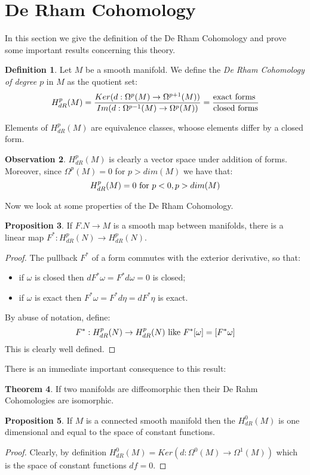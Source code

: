 \documentclass[12pt,a4paper]{report}
\theoremstyle{definition}
\newtheorem{Def}{Definition}[chapter]
\theoremstyle{Theorem}
\newtheorem{Theo}[Def]{Theorem}
\newtheorem{Prop}[Def]{Proposition}
\theoremstyle{definition}
\theoremstyle{definition}
\newtheorem{Obs}[Def]{Observation}
\begin{document}
	\section{De Rham Cohomology}
	In this section we give the definition of the De Rham Cohomology and prove some important results concerning this theory.
	\begin{Def}
		Let $M$ be a smooth manifold. We define the \textit{De Rham Cohomology of degree $p$} in $M$ as the quotient set:
		$$H_{dR}^p(M)={Ker(d:\Omega^p(M)\rightarrow \Omega^{p+1}(M))\over Im(d:\Omega^{p-1}(M)\rightarrow \Omega^{p}(M))}={\hbox{exact forms }\over \hbox{closed forms}}$$ 
	\end{Def}
	Elements of $H_{dR}^p(M)$ are equivalence classes, whoose elements differ by a closed form.
	\begin{Obs}
		$H_{dR}^p(M)$ is clearly a vector space under addition of forms. Moreover, since $\Omega^p(M)=0$ for $p>dim(M)$ we have that:
		$$H^p_{dR}(M)=0\hbox{ for }p<0,p>dim(M)$$
	\end{Obs}
	Now we look at some properties of the De Rham Cohomology.
	\begin{Prop}
		If $F.N\rightarrow M$ is a smooth map between manifolds, there is a linear map $F^*:H^p_{dR}(N)\rightarrow H^p_{dR}(N)$.
	\end{Prop}
	\begin{proof}
		The pullback $F^*$ of a form commutes with the exterior derivative, so that:
		\begin{itemize}
			\item if $\omega$ is closed then $dF^*\omega=F^*d\omega=0$ is closed;
			\item if $\omega$ is exact then $F^*\omega=F^*d\eta=dF^*\eta$ is exact.
		\end{itemize}
		By abuse of notation, define:
		$$F^*:H^p_{dR}(N)\rightarrow H^p_{dR}(N) \hbox{ like }F^*[\omega]=[F^*\omega]$$
		This is clearly well defined.
	\end{proof}
	There is an immediate important consequence to this result:
	\begin{Theo}
		If two manifolds are diffeomorphic then their De Rahm Cohomologies are isomorphic.
	\end{Theo}
	\begin{Prop}
		If $M$ is a connected smooth manifold then the $H^0_{dR}(M)$ is one dimensional and equal to the space of constant functions.
	\end{Prop}
	\begin{proof}
		Clearly, by definition $H^0_{dR}(M)=Ker(d:\Omega^0(M)\rightarrow\Omega^1(M))$ which is the space of constant functions $df=0$.
	\end{proof}
\end{document}
